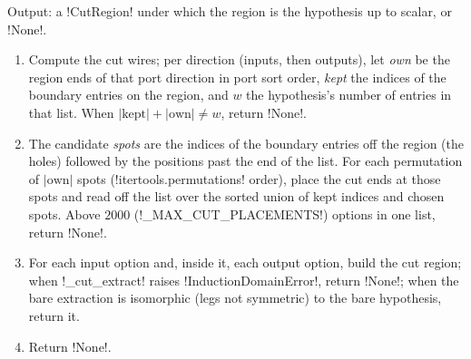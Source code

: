 \begin{algorithm}\label{alg:kernel-find-cut}
Output: a \py!CutRegion! under which the region is the hypothesis up to scalar, or \py!None!.
\begin{enumerate}
\item Compute the cut wires; per direction (inputs, then outputs), let \emph{own} be the region ends of that port direction in port sort order, \emph{kept} the indices of the boundary entries on the region, and $w$ the hypothesis's number of entries in that list. When $|\text{kept}|+|\text{own}|\neq w$, return \py!None!.
\item The candidate \emph{spots} are the indices of the boundary entries off the region (the holes) followed by the positions past the end of the list. For each permutation of $|\text{own}|$ spots (\py!itertools.permutations! order), place the cut ends at those spots and read off the list over the sorted union of kept indices and chosen spots. Above $2000$ (\py!_MAX_CUT_PLACEMENTS!) options in one list, return \py!None!.
\item For each input option and, inside it, each output option, build the cut region; when \py!_cut_extract! raises \py!InductionDomainError!, return \py!None!; when the bare extraction is isomorphic (legs not symmetric) to the bare hypothesis, return it.
\item Return \py!None!.
\end{enumerate}
\end{algorithm}

